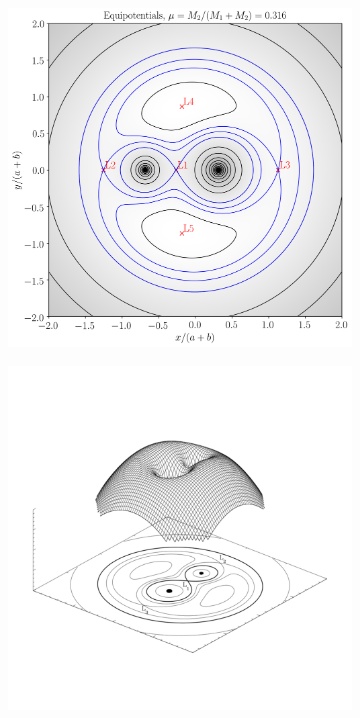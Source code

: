 \documentclass[../../main/thesis_msc.tex]{subfiles}
\begin{document}
				\begin{figure}[h]
   					\centering
    				\begin{subfigure}[h]{0.45\textwidth}
        				\centering
       					 \includegraphics[width = \linewidth]{../figures/chapter1/equipotentials_mu_0_316.png} 
    				\end{subfigure}
    				\hspace{0.01cm}
    				\begin{subfigure}[h]{0.535\textwidth}
        				\centering
        				\includegraphics[width = \linewidth]{../figures/chapter1/3Dequipotentials_transparent.png} 

\end{subfigure}
\end{figure}
\end{document}
